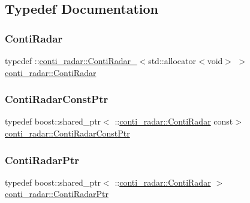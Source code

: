 \subsection{Typedef Documentation}
\mbox{\label{namespaceconti__radar_ab623e85ee56152c6974f390836e6752b}} 
\subsubsection{\texorpdfstring{Conti\+Radar}{ContiRadar}}
{\footnotesize\ttfamily typedef \+::\hyperlink{structconti__radar_1_1ContiRadar__}{conti\+\_\+radar\+::\+Conti\+Radar\+\_\+}$<$std\+::allocator$<$void$>$ $>$ \hyperlink{namespaceconti__radar_ab623e85ee56152c6974f390836e6752b}{conti\+\_\+radar\+::\+Conti\+Radar}}

\mbox{\label{namespaceconti__radar_ab3037b9355b5169ae9ddf4f993cd91ae}} 
\subsubsection{\texorpdfstring{Conti\+Radar\+Const\+Ptr}{ContiRadarConstPtr}}
{\footnotesize\ttfamily typedef boost\+::shared\+\_\+ptr$<$ \+::\hyperlink{namespaceconti__radar_ab623e85ee56152c6974f390836e6752b}{conti\+\_\+radar\+::\+Conti\+Radar} const$>$ \hyperlink{namespaceconti__radar_ab3037b9355b5169ae9ddf4f993cd91ae}{conti\+\_\+radar\+::\+Conti\+Radar\+Const\+Ptr}}

\mbox{\label{namespaceconti__radar_accbaddd07d13dedcfd159bf6ce03640e}} 
\subsubsection{\texorpdfstring{Conti\+Radar\+Ptr}{ContiRadarPtr}}
{\footnotesize\ttfamily typedef boost\+::shared\+\_\+ptr$<$ \+::\hyperlink{namespaceconti__radar_ab623e85ee56152c6974f390836e6752b}{conti\+\_\+radar\+::\+Conti\+Radar} $>$ \hyperlink{namespaceconti__radar_accbaddd07d13dedcfd159bf6ce03640e}{conti\+\_\+radar\+::\+Conti\+Radar\+Ptr}}

